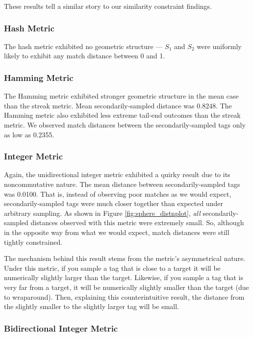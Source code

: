 These results tell a similar story to our similarity constraint findings.

\subsubsection{Hash Metric}
The hash metric exhibited no geometric structure --- $S_1$ and $S_2$ were uniformly likely to exhibit any match distance between 0 and 1.

\subsubsection{Hamming Metric}

The Hamming metric exhibited stronger geometric structure in the mean case than the streak metric.
Mean secondarily-sampled distance was 0.8248.
The Hamming metric also exhibited less extreme tail-end outcomes than the streak metric.
We observed match distances between the secondarily-sampled tags only as low as 0.2355.

\subsubsection{Integer Metric}

Again, the unidirectional integer metric exhibited a quirky result due to its noncommutative nature.
The mean distance between secondarily-sampled tags was 0.0100.
That is, instead of observing poor matches as we would expect, secondarily-sampled tags were much closer together than expected under arbitrary sampling.
As shown in Figure \ref{fig:sphere_distnplot}, \textit{all} secondarily-sampled distances observed with this metric were extremely small.
So, although in the opposite way from what we would expect, match distances were still tightly constrained.

The mechanism behind this result stems from the metric's asymmetrical nature.
Under this metric, if you sample a tag that is close to a target it will be numerically slightly larger than the target.
Likewise, if you sample a tag that is very far from a target, it will be numerically slightly smaller than the target (due to wraparound).
Then, explaining this counterintuitive result, the distance from the slightly smaller to the slightly larger tag will be small.

\subsubsection{Bidirectional Integer Metric}

